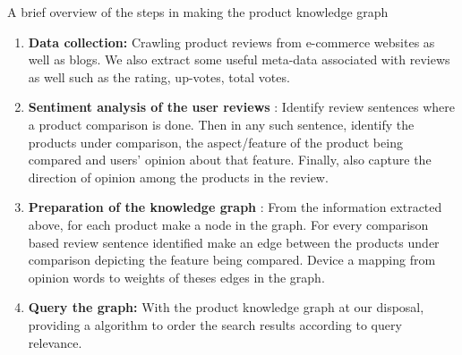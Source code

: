 \documentclass[12pt]{article}
\begin{document}
A brief overview of the steps in making the product knowledge graph
\begin{enumerate}
\item \textbf{Data collection:} Crawling product reviews from e-commerce websites as well as blogs. We also extract some useful meta-data associated with reviews as well such as the rating, up-votes, total votes.
\item \textbf{Sentiment analysis of the user reviews} : Identify review sentences where a product comparison is done. Then in any such sentence, identify the products under comparison, the aspect/feature of the product being compared and users' opinion about that feature. Finally, also capture the direction of opinion among the products in the review.
\item \textbf{Preparation of the knowledge graph} : From the information extracted above, for each product make a node in the graph. For every comparison based review sentence identified make an edge between the products under comparison depicting the feature being compared. Device a mapping from opinion words to weights of theses edges in the graph.
\item \textbf{Query the graph:} With the product knowledge graph at our disposal, providing a algorithm to order the search results according to query relevance. 

\end{enumerate}
\end{document}
